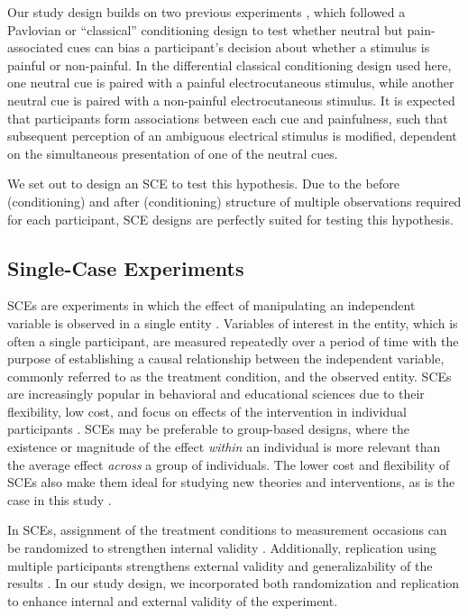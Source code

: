 \documentclass[empirical,issue, twocolumn,authordate]{jote-new-article}
\begin{document}
Our study design builds on two previous experiments \parencite{Madden2016, Traxler2019}, which followed a Pavlovian or “classical” conditioning design \parencite{Pavlov1928} to test whether neutral but pain-associated cues can bias a participant's decision about whether a stimulus is painful or non-painful. In the differential classical conditioning design used here, one neutral cue is paired with a painful electrocutaneous stimulus, while another neutral cue is paired with a non-painful electrocutaneous stimulus. It is expected that participants form associations between each cue and painfulness, such that subsequent perception of an ambiguous electrical stimulus is modified, dependent on the simultaneous presentation of one of the neutral cues.

We set out to design an SCE to test this hypothesis. Due to the before (conditioning) and after (conditioning) structure of multiple observations required for each participant, SCE designs are perfectly suited for testing this hypothesis.

\subsection{Single-Case Experiments}

SCEs are experiments in which the effect of manipulating an independent variable is observed in a single entity \parencite{Barlow2009, Kazdin2011}. Variables of interest in the entity, which is often a single participant, are measured repeatedly over a period of time with the purpose of establishing a causal relationship between the independent variable, commonly referred to as the treatment condition, and the observed entity. SCEs are increasingly popular in behavioral and educational sciences due to their flexibility, low cost, and focus on effects of the intervention in individual participants \parencite{Heyvaert2014}. SCEs may be preferable to group-based designs, where the existence or magnitude of the effect \emph{within} an individual is more relevant than the average effect \emph{across} a group of individuals. The lower cost and flexibility of SCEs also make them ideal for studying new theories and interventions, as is the case in this study \parencite{Vlaeyen2020}.

In SCEs, assignment of the treatment conditions to measurement occasions can be randomized to strengthen internal validity \parencite{Kratochwill2010, Edgington1975}. Additionally, replication using multiple participants strengthens external validity and generalizability of the results \parencite{Kratochwill2010, Horner2005}. In our study design, we incorporated both randomization and replication to enhance internal and external validity of the experiment. 
\end{document}
